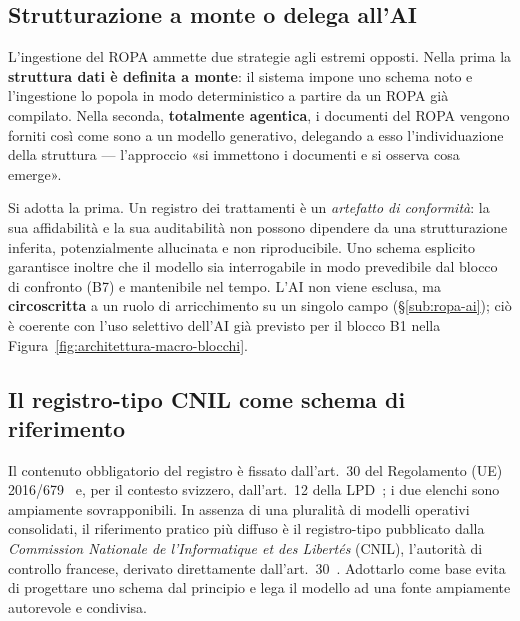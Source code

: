 \subsection{Strutturazione a monte o delega all'AI}
\label{sub:ropa-approccio}

L'ingestione del ROPA ammette due strategie agli estremi opposti. Nella prima la \textbf{struttura dati è definita a monte}: il sistema impone uno schema noto e l'ingestione lo popola in modo deterministico a partire da un ROPA già compilato. Nella seconda, \textbf{totalmente agentica}, i documenti del ROPA vengono forniti così come sono a un modello generativo, delegando a esso l'individuazione della struttura --- l'approccio «si immettono i documenti e si osserva cosa emerge».

Si adotta la prima. Un registro dei trattamenti è un \textit{artefatto di conformità}: la sua affidabilità e la sua auditabilità non possono dipendere da una strutturazione inferita, potenzialmente allucinata e non riproducibile. Uno schema esplicito garantisce inoltre che il modello sia interrogabile in modo prevedibile dal blocco di confronto (B7) e mantenibile nel tempo. L'AI non viene esclusa, ma \textbf{circoscritta} a un ruolo di arricchimento su un singolo campo (§\ref{sub:ropa-ai}); ciò è coerente con l'uso selettivo dell'AI già previsto per il blocco B1 nella Figura~\ref{fig:architettura-macro-blocchi}.

\subsection{Il registro-tipo CNIL come schema di riferimento}
\label{sub:ropa-cnil}

Il contenuto obbligatorio del registro è fissato dall'art.~30 del Regolamento (UE) 2016/679~\cite{gdprArt30} e, per il contesto svizzero, dall'art.~12 della LPD~\cite{nlpdArt12}; i due elenchi sono ampiamente sovrapponibili. In assenza di una pluralità di modelli operativi consolidati, il riferimento pratico più diffuso è il registro-tipo pubblicato dalla \textit{Commission Nationale de l'Informatique et des Libertés} (CNIL), l'autorità di controllo francese, derivato direttamente dall'art.~30~\cite{cnilRegistreTraitement, cnilRegistreModeleBasique}. Adottarlo come base evita di progettare uno schema dal principio e lega il modello ad una fonte ampiamente autorevole e condivisa.

